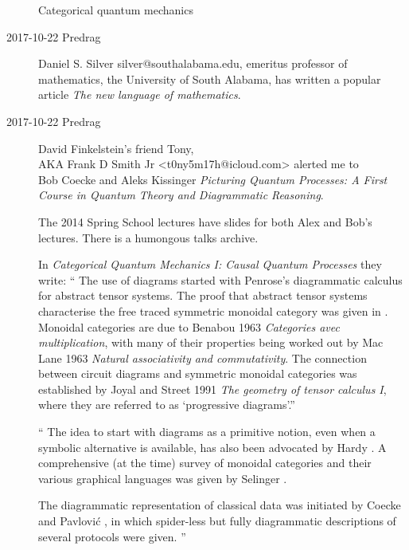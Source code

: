 \begin{description}
\HREF{}
{}

\HREF{}
{}

{Categorical quantum mechanics}

\item[2017-10-22 Predrag]
{Daniel S. Silver} silver@southalabama.edu, emeritus professor of mathematics,
the University of South Alabama, has written a popular article
{\em The new language of mathematics}.

\item[2017-10-22 Predrag] David Finkelstein's friend Tony,
\\
AKA Frank D Smith Jr <t0ny5m17h@icloud.com> alerted me to
\\

 {Bob Coecke} and
 {Aleks Kissinger}
{\em Picturing Quantum Processes: A First Course in Quantum Theory and
Diagrammatic Reasoning}.

The 2014 Spring School 
{lectures} have slides for both Alex and Bob's lectures. There is a humongous
 {talks archive}.

In {\em Categorical Quantum Mechanics I: Causal Quantum Processes}
they write: ``
The use of diagrams started with Penrose's diagrammatic calculus for abstract
tensor  systems.  The  proof  that  abstract  tensor  systems
characterise  the free traced symmetric monoidal category was given in
. Monoidal categories are due to Benabou 1963 {\em Categories
avec multiplication}, with many of their properties being worked out by Mac
Lane 1963 {\em Natural associativity and commutativity}.  The connection
between circuit diagrams and symmetric monoidal categories was established by
Joyal and Street 1991 {\em The geometry of tensor calculus I}, where they are
referred to as `progressive diagrams'.''

``
The idea to start with diagrams as a primitive notion, even when a symbolic
alternative is available, has also been advocated by Hardy . A
comprehensive (at the time) survey of monoidal categories and their various
graphical languages was given by Selinger .

The diagrammatic representation of classical data was initiated by Coecke and
Pavlovi\'c , in which spider-less but fully diagrammatic
descriptions of several protocols were given.
''


\end{description}
